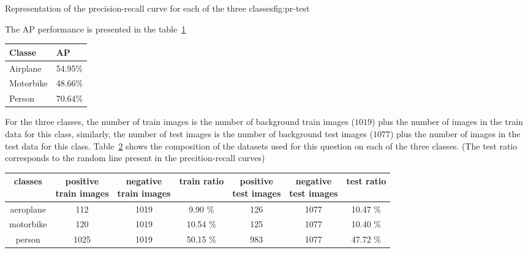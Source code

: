\documentclass{article}
\begin{document}
\triplefign
{}
{}
{}
{Representation of the precision-recall curve for each of the three classes}{fig:pr-test}

The AP performance is presented in the table~\ref{tab:ap}
\begin{table}[h!]
  \centering
  \begin{tabular}{| l | l |}
    \hline
    Classe & AP \\
    \hline
    Airplane  & 54.95\% \\
    Motorbike & 48.66\% \\
    Person    & 70.64\% \\
    \hline
  \end{tabular}
   \label{tab:ap}
\end{table}

For the three classes, the number of train images is the number of
background train images ($1019$) plus the number of images in the
train data for this class, similarly, the number of test images is the
number of background test images ($1077$) plus the number of images in
the test data for this class. Table~\ref{tab:train-test-comp} shows the
composition of the datasets used for this question on each of the
three classes. (The test ratio corresponds to the random line present
in the precition-recall curves)

\begin{table}[h!]
  \centering
  \begin{tabular}{| c | c | c | c | c | c | c |}
    \hline
    classes & \shortstack{positive \\ train images} & \shortstack{negative \\ train images} & train ratio & \shortstack{positive \\ test images} & \shortstack{negative \\ test images} & test ratio \\
    \hline
    aeroplane & 112 & 1019 & 9.90 \% & 126 & 1077 & 10.47 \%  \\
    motorbike & 120 & 1019 & 10.54 \% & 125 & 1077 & 10.40 \%  \\
    person    & 1025 & 1019 & 50.15 \% & 983 & 1077 & 47.72 \%  \\
    \hline
  \end{tabular}
   \label{tab:train-test-comp}
\end{table}
\end{document}

